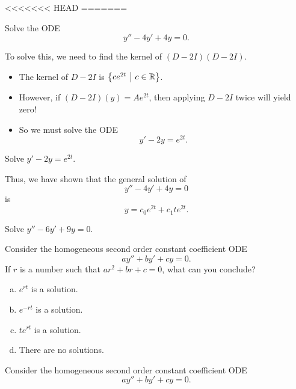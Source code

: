 
\begin{applicationActivities}

<<<<<<< HEAD
=======
\begin{activity}{10}
Solve the ODE \[ y''-4y'+4y=0.\]
\end{activity}

\begin{observation}
To solve this, we need to find the kernel of \( (D-2I)(D-2I) \).
\begin{itemize}
\item The kernel of \(D-2I\) is \(\left\{ ce^{2t}\ \middle|\ c \in \mathbb{R} \right\}\).
\item However, if \( (D-2I)(y) = Ae^{2t} \), then applying \(D-2I\) twice will yield zero!
\item So we must solve the ODE \[y'-2y=e^{2t}.\]
\end{itemize}
\end{observation}

\begin{activity}{15}
Solve \(y'-2y=e^{2t}\).
\end{activity}


\begin{observation}
Thus, we have shown that the general solution of \[y''-4y'+4y=0\] is \[y=c_0e^{2t}+c_1te^{2t}.\]
\end{observation}

\begin{activity}{15}
Solve \(y''-6y'+9y=0\).
\end{activity}

\begin{activity}{10}
Consider the homogeneous second order constant coefficient ODE \[ay''+by'+cy=0.\]
If \(r\) is a number such that \(ar^2+br+c=0\), what can you conclude?
\begin{enumerate}[(a)]
\item \(e^{rt}\) is a solution.
\item \(e^{-rt}\) is a solution.
\item \(te^{rt}\) is a solution.
\item There are no solutions.
\end{enumerate}
\end{activity}

\begin{activity}{5}
Consider the homogeneous second order constant coefficient ODE \[ay''+by'+cy=0.\]


\end{activity}
\end{applicationActivities}
